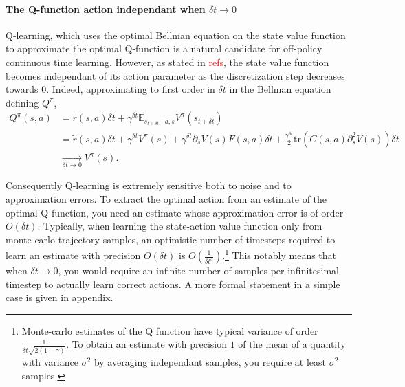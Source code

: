 \documentclass[11pt]{article}
\newcommand{\deltat}{{\delta t}}
\newcommand{\E}{\mathbb{E}}
\newcommand{\TODO}[1]{\textcolor{red}{#1}}
\newcommand{\bigO}[1]{O(#1)}
\begin{document}
\paragraph{The Q-function action independant when $\deltat \to 0$}
Q-learning, which uses the optimal Bellman equation on the state value function
to approximate the optimal Q-function is a natural candidate for off-policy
continuous time learning. However, as stated in \TODO{refs}, the state value function
becomes independant of its action parameter as the discretization step decreases towards
$0$. Indeed, approximating to first order in $\deltat$ in the Bellman equation defining
$Q^\pi$, 
\begin{align}
	Q^\pi(s, a) &= \tilde{r}(s, a)\deltat + \gamma^\deltat \E_{s_{t+\deltat} \mid a, s} 
	V^\pi(s_{t+\deltat})\nonumber\\
	&= \tilde{r}(s, a)\deltat + \gamma^\deltat V^\pi(s) + \gamma^\deltat \partial_s V(s) F(s, a) \deltat
	+ \frac{\gamma^\deltat}{2} \text{tr}\left(C(s, a)\partial^2_{s} V(s)\right) \deltat\nonumber\\
	&\to\limits_{\deltat \to 0} V^\pi(s).
\end{align}

Consequently Q-learning is extremely sensitive both to noise and to approximation errors.
To extract the optimal action from an estimate of the optimal Q-function, you need an estimate
whose approximation error is of order $\bigO{\deltat}$.
Typically, when learning the state-action value function only from monte-carlo trajectory samples, 
an optimistic number of timesteps required to learn an estimate with precision $\bigO{\deltat}$ is
$\bigO{\frac{1}{\deltat^3}}$.\footnote{
	Monte-carlo estimates of the Q function have typical variance of order
	$\frac{1}{\deltat\sqrt{2(1 - \gamma)}}$. To obtain an estimate with precision $1$ of the mean
	of a quantity with variance $\sigma^2$ by averaging independant samples, you
	require at least $\sigma^2$ samples.}
This notably means that when $\deltat \to 0$, you would require an infinite number of samples
per infinitesimal timestep to actually learn correct actions. A more formal statement in a simple case
is given in appendix.
\end{document}
